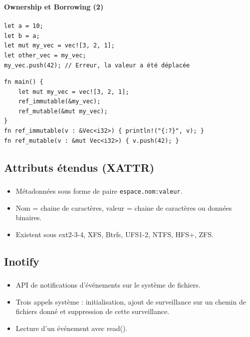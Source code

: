 \documentclass[10pt]{beamer}
\begin{document}
\begin{frame}[fragile]
    \frametitle{\subsecname}
    \framesubtitle{Ownership et Borrowing (2)}
    \begin{verbatim}
let a = 10;
let b = a;
let mut my_vec = vec![3, 2, 1]; 
let other_vec = my_vec;
my_vec.push(42); // Erreur, la valeur a été déplacée
    \end{verbatim}
    \begin{verbatim}
fn main() {
    let mut my_vec = vec![3, 2, 1];
    ref_immutable(&my_vec);
    ref_mutable(&mut my_vec);
}
fn ref_immutable(v : &Vec<i32>) { println!("{:?}", v); }
fn ref_mutable(v : &mut Vec<i32>) { v.push(42); }
    \end{verbatim}
\end{frame}

\subsection{Attributs étendus (XATTR)}
\begin{frame}
    \frametitle{\subsecname}
    \begin{itemize}
        \item Métadonnées sous forme de paire \texttt{espace.nom:valeur}.
        \item Nom = chaine de caractères, valeur = chaine de caractères ou données binaires.
        \item Existent sous ext2-3-4, XFS, Btrfs, UFS1-2, NTFS, HFS+, ZFS.
    \end{itemize}
\end{frame}

\subsection{Inotify}
\begin{frame}
    \frametitle{\subsecname}
    \begin{itemize}
        \item API de notifications d'événements sur le système de fichiers.
        \item Trois appels système : initialisation, ajout de surveillance sur un chemin de fichiers 
            donné et suppression de cette surveillance.
        \item Lecture d'un événement avec read().
    \end{itemize}
\end{frame}
\end{document}
